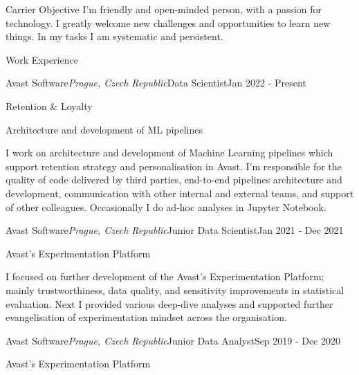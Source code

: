 \documentclass{resume} %
\begin{document}
\begin{rSection}{Carrier Objective}
I’m friendly and open-minded person, with a passion for technology. I greatly welcome new challenges and opportunities to learn new things. In my tasks I am systematic and persistent.
\end{rSection}

\begin{rSection}{Work Experience}
 
    \begin{rSubsection}{Avast Software}{\em Prague, Czech Republic}{Data Scientist}{Jan 2022 - Present}
        \item Retention \& Loyalty
        \item Architecture and development of ML pipelines
        
        I work on architecture and development of Machine Learning pipelines which support retention strategy and personalisation in Avast. I'm responsible for the quality of code delivered by third parties, end-to-end pipelines architecture and development, communication with other internal and external teams, and support of other colleagues. Occasionally I do ad-hoc analyses in Jupyter Notebook.

    \end{rSubsection}

    \begin{rSubsection}{Avast Software}{\em Prague, Czech Republic}{Junior Data Scientist}{Jan 2021 - Dec 2021}
        \item Avast's Experimentation Platform
        
        I focused on further development of the Avast's Experimentation Platform; mainly trustworthiness, data quality, and sensitivity improvements in statistical evaluation. Next I provided various deep-dive analyses and supported further evangelisation of experimentation mindset across the organisation.
        
    \end{rSubsection}
        
    \begin{rSubsection}{Avast Software}{\em Prague, Czech Republic}{Junior Data Analyst}{Sep 2019 - Dec 2020}
        \item Avast's Experimentation Platform
        

\end{rSubsection}
\end{rSection}
\end{document}
